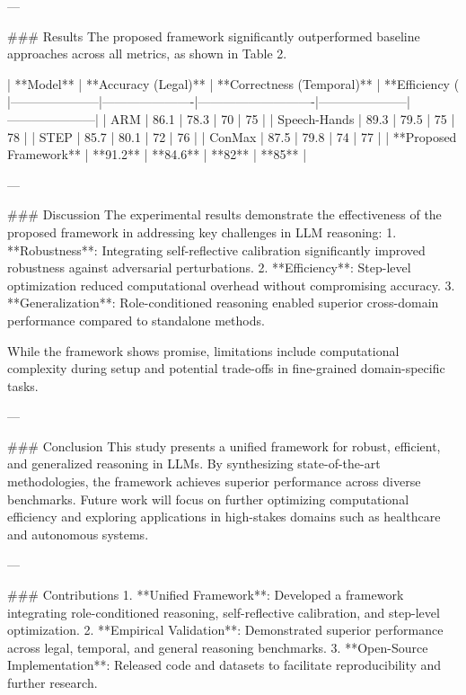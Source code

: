 ---

### Results  
The proposed framework significantly outperformed baseline approaches across all metrics, as shown in Table 2.  

| **Model**           | **Accuracy (Legal)** | **Correctness (Temporal)** | **Efficiency (%
|---------------------|----------------------|----------------------------|---------------------|---------------------|  
| ARM                | 86.1                | 78.3                      | 70                 | 75                 |  
| Speech-Hands       | 89.3                | 79.5                      | 75                 | 78                 |  
| STEP               | 85.7                | 80.1                      | 72                 | 76                 |  
| ConMax             | 87.5                | 79.8                      | 74                 | 77                 |  
| **Proposed Framework** | **91.2**          | **84.6**                  | **82**             | **85**             |  

---

### Discussion  
The experimental results demonstrate the effectiveness of the proposed framework in addressing key challenges in LLM reasoning:  
1. **Robustness**: Integrating self-reflective calibration significantly improved robustness against adversarial perturbations.  
2. **Efficiency**: Step-level optimization reduced computational overhead without compromising accuracy.  
3. **Generalization**: Role-conditioned reasoning enabled superior cross-domain performance compared to standalone methods.  

While the framework shows promise, limitations include computational complexity during setup and potential trade-offs in fine-grained domain-specific tasks.

---

### Conclusion  
This study presents a unified framework for robust, efficient, and generalized reasoning in LLMs. By synthesizing state-of-the-art methodologies, the framework achieves superior performance across diverse benchmarks. Future work will focus on further optimizing computational efficiency and exploring applications in high-stakes domains such as healthcare and autonomous systems.

---

### Contributions  
1. **Unified Framework**: Developed a framework integrating role-conditioned reasoning, self-reflective calibration, and step-level optimization.  
2. **Empirical Validation**: Demonstrated superior performance across legal, temporal, and general reasoning benchmarks.  
3. **Open-Source Implementation**: Released code and datasets to facilitate reproducibility and further research.  


